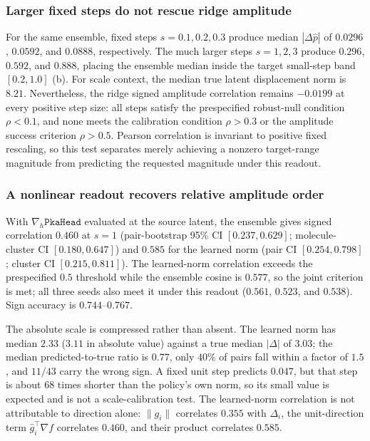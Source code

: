 \documentclass[11pt]{article}
\begin{document}
\subsubsection{Larger fixed steps do not rescue ridge amplitude} For the same ensemble, fixed steps $s=0.1,0.2,0.3$ produce median $|\Delta\hat p|$ of $0.0296$, $0.0592$, and $0.0888$, respectively. The much larger steps $s=1,2,3$ produce $0.296$, $0.592$, and $0.888$, placing the ensemble median inside the target small-step band $[0.2,1.0]$ (b). For scale context, the median true latent displacement norm is $8.21$. Nevertheless, the ridge signed amplitude correlation remains $-0.0199$ at every positive step size: all steps satisfy the prespecified robust-null condition $\rho<0.1$, and none meets the calibration condition $\rho>0.3$ or the amplitude success criterion $\rho>0.5$. Pearson correlation is invariant to positive fixed rescaling, so this test separates merely achieving a nonzero target-range magnitude from predicting the requested magnitude under this readout.

\subsubsection{A nonlinear readout recovers relative amplitude order} With $\nabla_h\texttt{PkaHead}$ evaluated at the source latent, the ensemble gives signed correlation $0.460$ at $s=1$ (pair-bootstrap 95\% CI $[0.237,0.629]$; molecule-cluster CI $[0.180,0.647]$) and $0.585$ for the learned norm (pair CI $[0.254,0.798]$; cluster CI $[0.215,0.811]$). The learned-norm correlation exceeds the prespecified $0.5$ threshold while the ensemble cosine is $0.577$, so the joint criterion is met; all three seeds also meet it under this readout ($0.561$, $0.523$, and $0.538$). Sign accuracy is $0.744$--$0.767$.

The absolute scale is compressed rather than absent. The learned norm has median $2.33$ ($3.11$ in absolute value) against a true median $|\Delta|$ of $3.03$; the median predicted-to-true ratio is $0.77$, only $40\%$ of pairs fall within a factor of $1.5$, and $11/43$ carry the wrong sign. A fixed unit step predicts $0.047$, but that step is about $68$ times shorter than the policy's own norm, so its small value is expected and is not a scale-calibration test. The learned-norm correlation is not attributable to direction alone: $\|g_i\|$ correlates $0.355$ with $\Delta_i$, the unit-direction term $\hat g_i^\top\nabla f$ correlates $0.460$, and their product correlates $0.585$.
\end{document}
